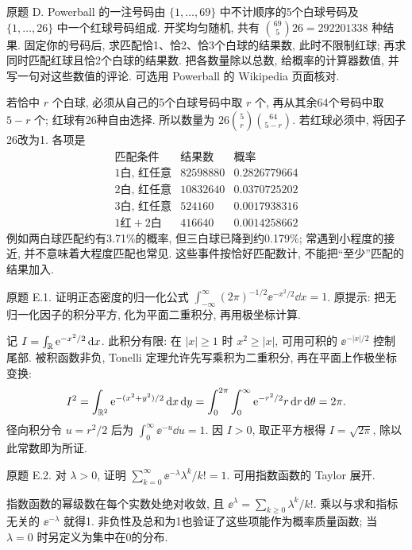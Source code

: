 \begin{exercise}\label{ps1-d}
原题 D. Powerball 的一注号码由 $\{1,\ldots,69\}$ 中不计顺序的5个白球号码及 $\{1,\ldots,26\}$ 中一个红球号码组成. 开奖均匀随机, 共有 $\binom{69}{5}26=292201338$ 种结果. 固定你的号码后, 求匹配恰1、恰2、恰3个白球的结果数, 此时不限制红球; 再求同时匹配红球且恰2个白球的结果数. 把各数量除以总数, 给概率的计算器数值, 并写一句对这些数值的评论. 可选用 Powerball 的 Wikipedia 页面核对.
\end{exercise}
\begin{solution}
若恰中 $r$ 个白球, 必须从自己的5个白球号码中取 $r$ 个, 再从其余64个号码中取 $5-r$ 个; 红球有26种自由选择. 所以数量为 $26\binom5r\binom{64}{5-r}$. 若红球必须中, 将因子26改为1. 各项是
\[
\begin{array}{c|r|c}
\text{匹配条件}&\text{结果数}&\text{概率}\\\hline
1\text{白, 红任意}&82598880&0.2826779664\\
2\text{白, 红任意}&10832640&0.0370725202\\
3\text{白, 红任意}&524160&0.0017938316\\
1\text{红}+2\text{白}&416640&0.0014258662
\end{array}
\]
例如两白球匹配约有3.71\%的概率, 但三白球已降到约0.179\%; 常遇到小程度的接近, 并不意味着大程度匹配也常见. 这些事件按恰好匹配数计, 不能把“至少”匹配的结果加入.
\end{solution}

\begin{exercise}\label{ps1-e1}
原题 E.1. 证明正态密度的归一化公式
$\int_{-\infty}^{\infty}(2\pi)^{-1/2}\ee^{-x^2/2}\dd x=1$.
原提示: 把无归一化因子的积分平方, 化为平面二重积分, 再用极坐标计算.
\end{exercise}
\begin{solution}
记 $I=\int_\mathbb R\mathrm e^{-x^2/2}\,\mathrm d x$. 此积分有限: 在 $|x|\ge1$ 时 $x^2\ge|x|$, 可用可积的 $\ee^{-|x|/2}$ 控制尾部. 被积函数非负, Tonelli 定理允许先写乘积为二重积分, 再在平面上作极坐标变换:
\[
I^2=\int_{\mathbb R^2}\mathrm e^{-(x^2+y^2)/2}\,\mathrm d x\,\mathrm d y
=\int_0^{2\pi}\int_0^\infty\mathrm e^{-r^2/2}r\,\mathrm d r\,\mathrm d\theta=2\pi.
\]
径向积分令 $u=r^2/2$ 后为 $\int_0^\infty\ee^{-u}\dd u=1$. 因 $I>0$, 取正平方根得 $I=\sqrt{2\pi}$, 除以此常数即为所证.
\end{solution}

\begin{exercise}\label{ps1-e2}
原题 E.2. 对 $\lambda>0$, 证明 $\sum_{k=0}^{\infty}\ee^{-\lambda}\lambda^k/k!=1$. 可用指数函数的 Taylor 展开.
\end{exercise}
\begin{solution}
指数函数的幂级数在每个实数处绝对收敛, 且 $\ee^\lambda=\sum_{k\ge0}\lambda^k/k!$. 乘以与求和指标无关的 $\ee^{-\lambda}$ 就得1. 非负性及总和为1也验证了这些项能作为概率质量函数; 当 $\lambda=0$ 时另定义为集中在0的分布.
\end{solution}

